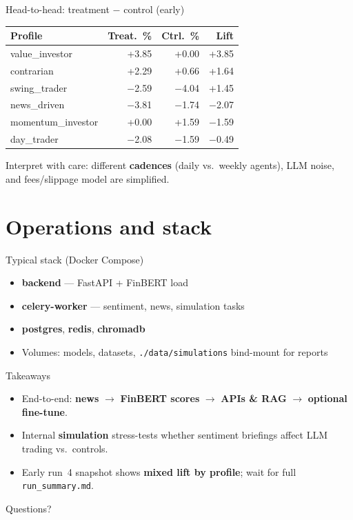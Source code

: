\documentclass[aspectratio=169,11pt]{beamer}
\begin{document}
\begin{frame}{Head-to-head: treatment $-$ control (early)}
  \footnotesize
  \begin{tabular}{@{}l r r r@{}}
    \toprule
    Profile & Treat.\ \% & Ctrl.\ \% & Lift \\
    \midrule
    value\_investor & +3.85 & +0.00 & +3.85 \\
    contrarian & +2.29 & +0.66 & +1.64 \\
    swing\_trader & $-$2.59 & $-$4.04 & +1.45 \\
    news\_driven & $-$3.81 & $-$1.74 & $-$2.07 \\
    momentum\_investor & +0.00 & +1.59 & $-$1.59 \\
    day\_trader & $-$2.08 & $-$1.59 & $-$0.49 \\
    \bottomrule
  \end{tabular}

  \vfill
  \footnotesize Interpret with care: different \textbf{cadences} (daily vs.\ weekly agents), LLM noise, and fees/slippage model are simplified.
\end{frame}

\section{Operations and stack}

\begin{frame}{Typical stack (Docker Compose)}
  \begin{itemize}
    \item \textbf{backend} --- FastAPI + FinBERT load
    \item \textbf{celery-worker} --- sentiment, news, simulation tasks
    \item \textbf{postgres}, \textbf{redis}, \textbf{chromadb}
    \item Volumes: models, datasets, \texttt{./data/simulations} bind-mount for reports
  \end{itemize}
\end{frame}

\begin{frame}{Takeaways}
  \begin{itemize}
    \item End-to-end: \textbf{news} $\rightarrow$ \textbf{FinBERT scores} $\rightarrow$ \textbf{APIs \& RAG} $\rightarrow$ \textbf{optional fine-tune}.
    \item Internal \textbf{simulation} stress-tests whether sentiment briefings affect LLM trading vs.\ controls.
    \item Early run~4 snapshot shows \textbf{mixed lift by profile}; wait for full \texttt{run\_summary.md}.
  \end{itemize}
\end{frame}

\begin{frame}
  \centering
  \vfill
  {\Huge Questions?}
  \vfill
\end{frame}
\end{document}
